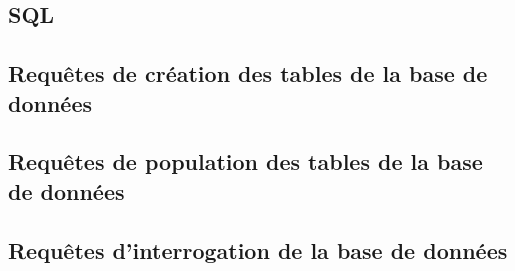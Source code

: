\documentclass[a4paper,12pt]{article}
\begin{document}
\begin{appendices}
\section*{SQL}
\subsection{Requêtes de création des tables de la base de données}



\subsection{Requêtes de population des tables de la base de données}


\subsection{Requêtes d'interrogation de la base de données}


\end{appendices}
\end{document}
